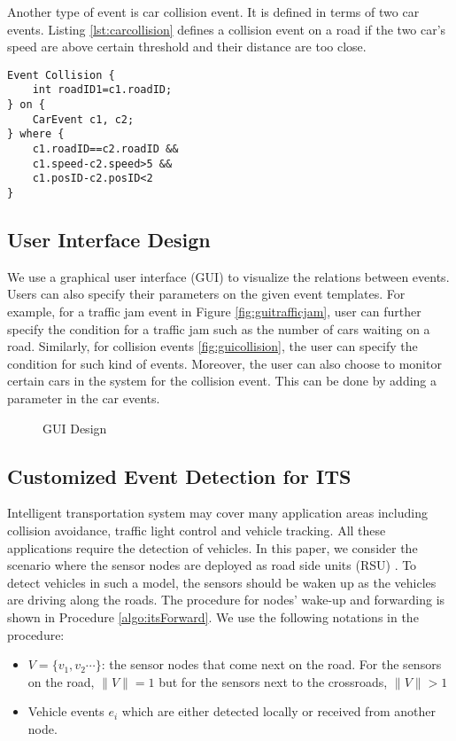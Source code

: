 Another type of event is car collision event. It is defined in terms of two car events. Listing \ref{lst:carcollision} defines a collision event on a road if the two car's speed are above certain threshold and their distance are too close.
\begin{lstlisting}[caption=Car collision event, label=lst:carcollision]
Event Collision {
	int roadID1=c1.roadID;
} on {
	CarEvent c1, c2;
} where {
	c1.roadID==c2.roadID &&
	c1.speed-c2.speed>5 && 
	c1.posID-c2.posID<2 
}
\end{lstlisting}

\subsection{User Interface Design}
We use a graphical user interface (GUI) to visualize the relations between events. Users can also specify their parameters on the given event templates. For example, for a traffic jam event in Figure \ref{fig:guitrafficjam}, user can further specify the condition for a traffic jam such as the number of cars waiting on a road. Similarly, for collision events \ref{fig:guicollision}, the user can specify the condition for such kind of events. Moreover, the user can also choose to monitor certain cars in the system for the collision event. This can be done by adding a parameter in the car events.

\begin{figure}
\centering
{}
\caption{GUI Design}
\label{fig:gui}
\end{figure}

\subsection{Customized Event Detection for ITS}
Intelligent transportation system may cover many application areas including collision avoidance, traffic light control and vehicle tracking. All these applications require the detection of vehicles. In this paper, we consider the scenario where the sensor nodes are deployed as road side units (RSU) \cite{klein:its}. To detect vehicles in such a model, the sensors should be waken up as the vehicles are driving along the roads. The procedure for nodes' wake-up and forwarding is shown in Procedure \ref{algo:itsForward}. We use the following notations in the procedure:
\begin{itemize}
\item \(V=\{v_1, v_2 \cdots \}\): the sensor nodes that come next on the road. For the sensors on the road, \(\|V\|=1\) but for the sensors next to the crossroads, \(\|V\|>1\)
\item Vehicle events \(e_i\) which are either detected locally or received from another node.
\end{itemize}

